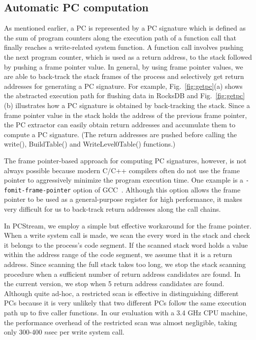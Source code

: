 \vspace{-5pt}
\subsection{Automatic PC computation}
As mentioned earlier, a PC is represented by a PC signature which is defined as
the sum of program counters along the execution path of a function call that
finally reaches a write-related system function. A function call involves
pushing the next program counter, which is used as a return address, to the
stack followed by pushing a frame pointer value.  In general, by using frame
pointer values, we are able to back-track the stack frames of the process and
selectively get return addresses for generating a PC signature.  For example,
Fig.~\ref{fig:getpc}(a) shows the abstracted execution path for flushing data
in RocksDB and Fig.~\ref{fig:getpc}(b) illustrates how a PC signature is obtained
by back-tracking the stack.  
Since a frame pointer value in the stack holds the address of the previous
frame pointer, the PC extractor can easily obtain return addresses and
accumulate them to compute a PC signature. (The return addresses are pushed
before calling the {\sf write()}, {\sf BuildTable()} and {\sf
WriteLevel0Table()} functions.)



The frame pointer-based approach for computing PC signatures, however, is not
always possible because modern C/C++ compilers often do not use the frame
pointer to aggressively minimize the program execution time.
One example is a
{\tt -fomit-frame-pointer} option of GCC~\cite{GCC}. 
Although this option allows the frame pointer to be used as a general-purpose
register for high performance, it makes very difficult for us to back-track
return addresses along the call chains.  

In PCStream, we employ a simple but effective workaround for the frame pointer.
When a write system call is made, we scan the every word in the stack and check
it belongs to the process's code segment.  If the scanned stack word holds a
value within the address range of the code segment, we assume that it is a
return address.  Since scanning the full stack takes too long, we stop the
stack scanning procedure when a sufficient number of return address candidates
are found.  In the current version, we stop when 5 return address candidates
are found.  Although quite ad-hoc, a restricted scan is effective in
distinguishing different PCs because it is very unlikely that two different PCs
follow the same execution path up to five caller functions.   In our evaluation
with a 3.4 GHz CPU machine, the performance overhead of the restricted scan was
almost negligible, taking only 300-400 $n$sec per write system call.

